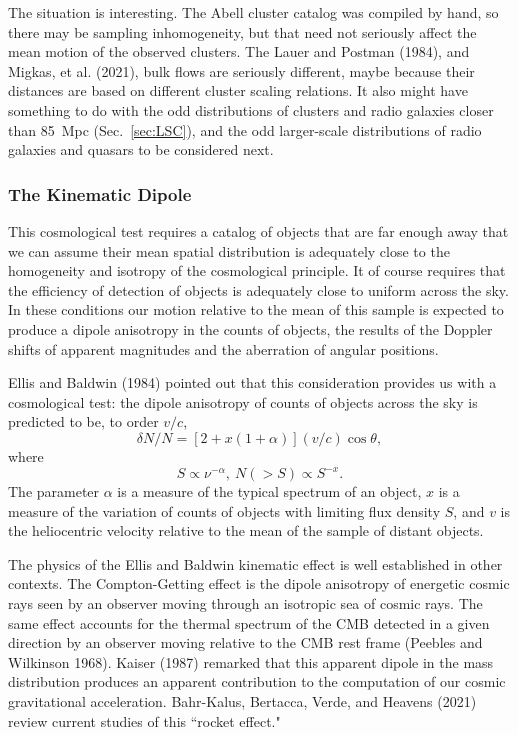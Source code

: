 \documentclass[fleqn,12pt]{article}
\newcommand{\beq}{\begin{equation}}
\newcommand{\eeq}{\end{equation}}
\begin{document}
The situation is interesting. The Abell cluster catalog was compiled by hand, so there may be sampling inhomogeneity, but that need not seriously affect the mean motion of the observed clusters. The Lauer and Postman (1984), and  Migkas, et al. (2021), bulk flows are seriously different, maybe because their distances are based on different cluster scaling relations. It also might have something to do with the odd distributions of clusters and radio galaxies closer than 85~Mpc (Sec.~\ref{sec:LSC}), and the odd larger-scale distributions of radio galaxies and quasars to be considered next. 

\subsubsection{The Kinematic Dipole}\label{sec:KinematicDipole} 

This cosmological test requires a catalog of objects that are far enough away that we can assume their mean spatial distribution is adequately close to the homogeneity and isotropy of the cosmological principle. It of course requires that the efficiency of detection of objects is adequately close to uniform across the sky. In these conditions our motion relative to the mean of this sample is expected to produce a dipole anisotropy in the counts of objects, the results of the Doppler shifts of apparent magnitudes and the aberration of angular positions. 

Ellis and Baldwin (1984) pointed out that this consideration provides us with a cosmological test: the dipole anisotropy of counts of objects across the sky is predicted to be, to order $v/c$,
\beq
\delta N/N = [2+x(1+\alpha)](v/c)\cos\theta, \label{eq:EllisBaldwin}
\eeq
where
\beq
 S\propto \nu^{-\alpha}, \ N(>S) \propto S^{-x}. \label{eq:EBparameters}
\eeq
The parameter $\alpha$ is a measure of the typical spectrum of an object, $x$ is a measure of the variation of counts of objects with limiting flux density $S$, and $v$ is the heliocentric velocity relative to the mean of the sample of distant objects.

The physics of the Ellis and Baldwin kinematic effect is well established in other contexts. The Compton-Getting effect is the dipole anisotropy of energetic cosmic rays seen by an observer moving through an isotropic sea of cosmic rays. The same effect accounts for the thermal spectrum of the CMB detected in a given direction by an observer moving relative to the CMB rest frame (Peebles and Wilkinson 1968). Kaiser (1987) remarked that this apparent dipole in the mass distribution produces an apparent contribution to the computation of our cosmic gravitational acceleration. Bahr-Kalus, Bertacca, Verde, and Heavens (2021) review current studies of this ``rocket effect." 
\end{document}
